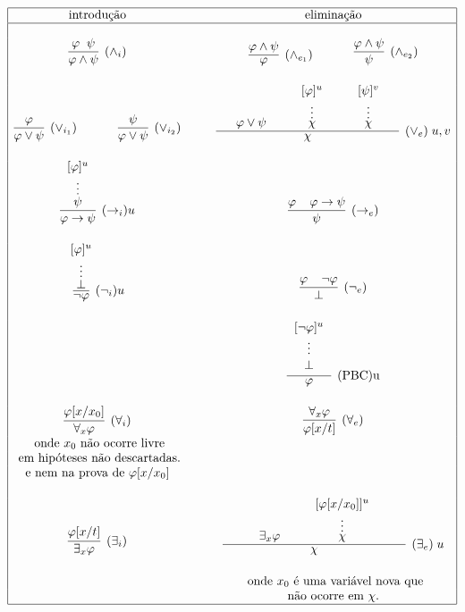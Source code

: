 \documentclass[a4paper]{article}
\newcommand{\toe}{(\to_e)}
\newcommand{\toi}{(\to_i)}
\newcommand{\landi}{(\land_i)}
\newcommand{\landel}{(\land_{e_1})}
\newcommand{\lander}{(\land_{e_2})}
\newcommand{\lorl}{(\lor_{i_1})}
\newcommand{\lorr}{(\lor_{i_2})}
\newcommand{\lore}[2]{(\lor_e)\;{#1,#2}}
\newcommand{\nege}{(\neg_e)}
\newcommand{\negi}{(\neg_i)}
\newcommand{\pbc}{(\rm{PBC})}
\newcommand{\alle}{(\forall_e)}
\newcommand{\alli}{(\forall_i)}
\newcommand{\exie}[1]{(\exists_e)\;{#1}}
\newcommand{\exii}{(\exists_i)}
\begin{document}
\begin{enumerate}
\[\begin{array}{|c@{\hspace{1cm}}c|}
 \hline
 \mbox{introdução} & \mbox{eliminação} \\
 \hline 
 &\\
 \infer[\landi]{\varphi\wedge\psi}{\varphi\;\;\psi} & 
 \infer[\landel]{\varphi}{\varphi\wedge\psi} \;\;\;\;\;\;\;\;\;\;\;\; \infer[\lander]{\psi}{\varphi\wedge\psi}\\[5mm]
 \infer[\lorl]{\varphi\vee\psi}{\varphi} \;\;\;\;\;\;\;\;\;\;\;\; \infer[\lorr]{\varphi\vee\psi}{\psi} &
 \infer[\lore{u}{v}]{\mbox{}\hspace{2.5cm}\chi\hspace{2.5cm}\mbox{}}{\deduce{\varphi\vee\psi}{}\hspace{10mm}\deduce{\chi}{\deduce{\vdots}{[\varphi]^u}}\hspace{10mm}
   \deduce{\chi}{\deduce{\vdots}{[\psi]^v}}}\\[5mm]
 \infer[\toi{u}]{\varphi\rightarrow\psi}{\deduce{\psi}{\deduce{\vdots}{[\varphi]^u}}} & 
 \infer[\toe]{\psi}{\varphi\;\;\;\; \varphi \rightarrow \psi} \\[5mm]
 \infer[\negi{u}]{\neg\varphi}{\deduce{\bot}{\deduce{\vdots}{[\varphi]^u}}} & 
 \infer[\nege]{\bot}{\varphi\;\;\;\; \neg\varphi} \\[5mm]
 & \infer[\pbc{u}]{\varphi}{\mbox{\begin{tabular}{c}$[\lnot\varphi]^u$ \\ $\vdots$ \\ $\bot$
                                  \end{tabular}}}  \\[5mm]
    \infer[\alli]{\forall_x \varphi}{\varphi[x/x_0]} & \infer[\alle]{\varphi[x/t]}{\forall_x \varphi} \\
    \mbox{ onde } x_0 \mbox{ não ocorre livre} & \\ \mbox{ em hipóteses não descartadas.} & \\
    \mbox{e nem na prova de } \varphi[x/x_0] & \\[5mm]
    \infer[\exii]{\exists_x \varphi}{\varphi[x/t]} &
                                                     \infer[\exie{u}]{\mbox{}\hspace{2.5cm}\chi\hspace{2.5cm}\mbox{}}{\deduce{\exists_x\varphi}{}
                                                     \hspace{10mm}\deduce{\chi}{\deduce{\vdots}{[\varphi[x/x_0]]^u}}}  \\[5mm]
                   & \mbox{ onde } x_0 \mbox{ é uma variável nova que}
                     \\ & \mbox{não ocorre em } \chi. \\  \hline
 \end{array}\]



\end{enumerate}
\end{document}
